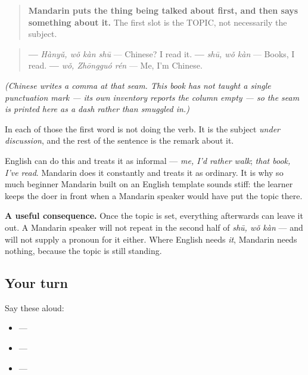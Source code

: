\begin{grammarlens}[title={Grammar Lens: the topic comes first}]
\begin{quote}
\textbf{Mandarin puts the thing being talked about first, and then says something about it.} The first slot is the TOPIC, not necessarily the subject.
\end{quote}

\begin{quote}
\textbf{ — } \emph{Hànyǔ, wǒ kàn shū} — Chinese? I read it. \textbf{ — } \emph{shū, wǒ kàn} — Books, I read. \textbf{ — } \emph{wǒ, Zhōngguó rén} — Me, I'm Chinese.
\end{quote}

\emph{(Chinese writes a comma at that seam. This book has not taught a single punctuation mark — its own inventory reports the column empty — so the seam is printed here as a dash rather than smuggled in.)}

In each of those the first word is not doing the verb. It is the subject \emph{under discussion}, and the rest of the sentence is the remark about it.

English can do this and treats it as informal — \emph{me, I'd rather walk}; \emph{that book, I've read}. Mandarin does it constantly and treats it as ordinary. It is why so much beginner Mandarin built on an English template sounds stiff: the learner keeps the doer in front when a Mandarin speaker would have put the topic there.

\textbf{A useful consequence.} Once the topic is set, everything afterwards can leave it out. A Mandarin speaker will not repeat  in the second half of \emph{shū, wǒ kàn} — and will not supply a pronoun for it either. Where English needs \emph{it}, Mandarin needs nothing, because the topic is still standing.
\end{grammarlens}

\subsection*{Your turn}
Say these aloud:

\begin{itemize}
\raggedright
  \item {} — 
  \item {} — 
  \item {} — 
\end{itemize}

